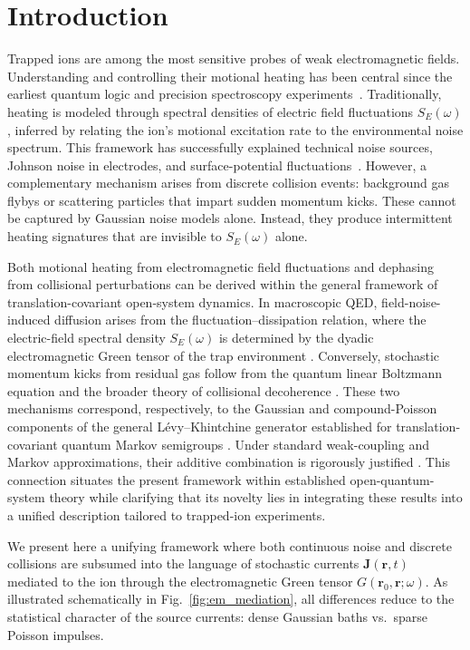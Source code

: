 \section{Introduction}
Trapped ions are among the most sensitive probes of weak electromagnetic fields.
Understanding and controlling their motional heating has been central since the earliest quantum logic and precision spectroscopy experiments~\cite{Turchette2000,Wineland1998}.
Traditionally, heating is modeled through spectral densities of electric field fluctuations $S_E(\omega)$, inferred by relating the ion's motional excitation rate to the environmental noise spectrum.
This framework has successfully explained technical noise sources, Johnson noise in electrodes, and surface-potential fluctuations~\cite{Brownnutt2015}.
However, a complementary mechanism arises from discrete collision events: background gas flybys or scattering particles that impart sudden momentum kicks.
These cannot be captured by Gaussian noise models alone.
Instead, they produce intermittent heating signatures that are invisible to $S_E(\omega)$ alone.

Both motional heating from electromagnetic field fluctuations and
dephasing from collisional perturbations can be derived within the general
framework of translation-covariant open-system dynamics.
In macroscopic QED, field-noise-induced diffusion arises from the
fluctuation--dissipation relation, where the electric-field spectral
density $S_E(\omega)$ is determined by the dyadic electromagnetic Green
tensor of the trap environment
\cite{ScheelBuhmann2008,BrownnuttRMP2015,BuhmannDispersionForcesII}.
Conversely, stochastic momentum kicks from residual gas follow from the
quantum linear Boltzmann equation and the broader theory of collisional
decoherence
\cite{HornbergerSipe2003,VacchiniHornberger2009,OghittuNJPhys2023}.
These two mechanisms correspond, respectively, to the Gaussian and
compound-Poisson components of the general
L\'evy--Khintchine generator established for
translation-covariant quantum Markov semigroups
\cite{Holevo1993,VacchiniJMathPhys2001}.
Under standard weak-coupling and Markov approximations, their additive
combination is rigorously justified
\cite{BreuerPetruccione2002}.
This connection situates the present framework within established
open-quantum-system theory while clarifying that its novelty lies in
integrating these results into a unified description tailored to
trapped-ion experiments.

We present here a unifying framework where both continuous noise and discrete collisions are subsumed into the language of stochastic currents $\mathbf{J}(\mathbf{r},t)$ mediated to the ion through the electromagnetic Green tensor $G(\mathbf{r}_0,\mathbf{r};\omega)$.
As illustrated schematically in Fig.~\ref{fig:em_mediation}, all differences reduce to the statistical character of the source currents: dense Gaussian baths vs.~sparse Poisson impulses.

